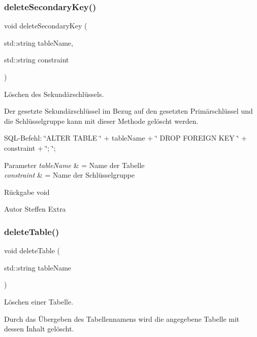 \subsubsection{delete\+Secondary\+Key()}
{\footnotesize\ttfamily void delete\+Secondary\+Key (\begin{DoxyParamCaption}\item[{std\+::string}]{table\+Name,  }\item[{std\+::string}]{constraint }\end{DoxyParamCaption})}



Löschen des Sekundärschlüssels. 

Der gesetzte Sekundärschlüssel im Bezug auf den gesetzten Primärschlüssel und die Schlüsselgruppe kann mit dieser Methode gelöscht werden.~\newline


S\+Q\+L-\/\+Befehl\+: \char`\"{}\+A\+L\+T\+E\+R T\+A\+B\+L\+E \char`\"{} + table\+Name + \char`\"{} D\+R\+O\+P F\+O\+R\+E\+I\+G\+N K\+E\+Y \char`\"{} + constraint + \char`\"{}; \char`\"{};


\begin{DoxyParams}{Parameter}
{\em table\+Name} & = Name der Tabelle \\
\hline
{\em constraint} & = Name der Schlüsselgruppe\\
\hline
\end{DoxyParams}
\begin{DoxyReturn}{Rückgabe}
void
\end{DoxyReturn}
\begin{DoxyAuthor}{Autor}
Steffen Extra 
\end{DoxyAuthor}
\mbox{\label{tables_8hpp_a9754762b2c19711bf3dcbfceca61d97d}} 
\subsubsection{delete\+Table()}
{\footnotesize\ttfamily void delete\+Table (\begin{DoxyParamCaption}\item[{std\+::string}]{table\+Name }\end{DoxyParamCaption})}



Löschen einer Tabelle. 

Durch das Übergeben des Tabellennamens wird die angegebene Tabelle mit dessen Inhalt gelöscht.~\newline


